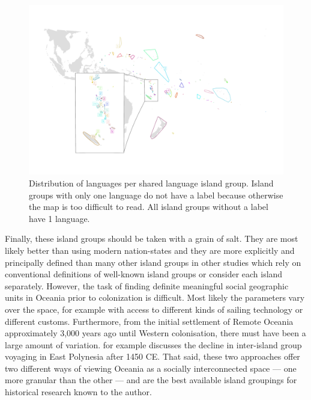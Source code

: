 \documentclass[unnumsec,webpdf,modern,medium]{oup-authoring-template}
\begin{document}
\begin{figure}
\centering
\includegraphics[width=\textwidth]{polygon_medium_group_map_vanuatu_mh_inset.png}
\caption{{Distribution of languages per shared language island group. Island groups with only one language do not have a label because otherwise the map is too difficult to read. All island groups without a label have 1 language.}}
\label{appendix_polygon_plot_medium}
\end{figure}

Finally, these island groups should be taken with a grain of salt. They are most likely better than using modern nation-states and they are more explicitly and principally defined than many other island groups in other studies which rely on conventional definitions of well-known island groups or consider each island separately. However, the task of finding definite meaningful social geographic units in Oceania prior to colonization is difficult. Most likely the parameters vary over the space, for example with access to different kinds of sailing technology or different customs. Furthermore, from the initial settlement of Remote Oceania approximately 3,000 years ago until Western colonisation, there must have been a large amount of variation. \citep{rolett2002voyaging} for example discusses the decline in inter-island group voyaging in East Polynesia after 1450 CE. That said, these two approaches offer two different ways of viewing Oceania as a socially interconnected space --- one more granular than the other --- and are the best available island groupings for historical research known to the author.
\end{document}
